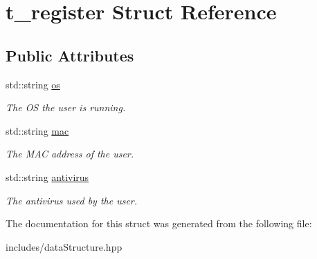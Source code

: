 \hypertarget{structt__register}{}\section{t\+\_\+register Struct Reference}
\label{structt__register}
\subsection*{Public Attributes}
\begin{DoxyCompactItemize}
\item 
\mbox{\label{structt__register_a1289fd58d08da296ffb3c4a43e2fb03a}} 
std\+::string \hyperlink{structt__register_a1289fd58d08da296ffb3c4a43e2fb03a}{os}
\begin{DoxyCompactList}\small\item\em The OS the user is running. \end{DoxyCompactList}\item 
\mbox{\label{structt__register_a8f5a2db7cac0cb5cb8034f1b34a2470a}} 
std\+::string \hyperlink{structt__register_a8f5a2db7cac0cb5cb8034f1b34a2470a}{mac}
\begin{DoxyCompactList}\small\item\em The M\+AC address of the user. \end{DoxyCompactList}\item 
\mbox{\label{structt__register_abcad59e2da2ca466659dc13f5dfeabde}} 
std\+::string \hyperlink{structt__register_abcad59e2da2ca466659dc13f5dfeabde}{antivirus}
\begin{DoxyCompactList}\small\item\em The antivirus used by the user. \end{DoxyCompactList}\end{DoxyCompactItemize}


The documentation for this struct was generated from the following file\+:\begin{DoxyCompactItemize}
\item 
includes/data\+Structure.\+hpp\end{DoxyCompactItemize}
